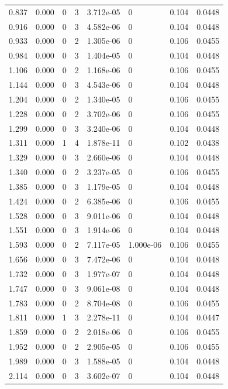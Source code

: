 \documentclass[preview]{standalone}
\begin{document}
{{\begin{tabular}{L{1.2cm}C{1.2cm} C{0.3cm}C{0.5cm} C{1.4cm}C{1.4cm} C{1.4cm}C{1.4cm}}
  0.837  &  0.000  & 0     &  3 &  3.712e-05  & 0  & 0.104 &  0.0448   \\ 
  0.916  &  0.000  & 0     &  3 &  4.582e-06  & 0  & 0.104 &  0.0448   \\ 
  0.933  &  0.000  & 0     &  2 &  1.305e-06  & 0  & 0.106 &  0.0455   \\ 
  0.984  &  0.000  & 0     &  3 &  1.404e-05  & 0  & 0.104 &  0.0448   \\ 
  1.106  &  0.000  & 0     &  2 &  1.168e-06  & 0  & 0.106 &  0.0455   \\ 
  1.144  &  0.000  & 0     &  3 &  4.543e-06  & 0  & 0.104 &  0.0448   \\ 
  1.204  &  0.000  & 0     &  2 &  1.340e-05  & 0  & 0.106 &  0.0455   \\ 
  1.228  &  0.000  & 0     &  2 &  3.702e-06  & 0  & 0.106 &  0.0455   \\ 
  1.299  &  0.000  & 0     &  3 &  3.240e-06  & 0  & 0.104 &  0.0448   \\ 
  1.311  &  0.000  & 1     &  4 &  1.878e-11  & 0  & 0.102 &  0.0438   \\ 
  1.329  &  0.000  & 0     &  3 &  2.660e-06  & 0  & 0.104 &  0.0448   \\ 
  1.340  &  0.000  & 0     &  2 &  3.237e-05  & 0  & 0.106 &  0.0455   \\ 
  1.385  &  0.000  & 0     &  3 &  1.179e-05  & 0  & 0.104 &  0.0448   \\ 
  1.424  &  0.000  & 0     &  2 &  6.385e-06  & 0  & 0.106 &  0.0455   \\ 
  1.528  &  0.000  & 0     &  3 &  9.011e-06  & 0  & 0.104 &  0.0448   \\ 
  1.551  &  0.000  & 0     &  3 &  1.914e-06  & 0  & 0.104 &  0.0448   \\ 
  1.593  &  0.000  & 0     &  2 &  7.117e-05  & 1.000e-06  & 0.106 &  0.0455   \\ 
  1.656  &  0.000  & 0     &  3 &  7.472e-06  & 0  & 0.104 &  0.0448   \\ 
  1.732  &  0.000  & 0     &  3 &  1.977e-07  & 0  & 0.104 &  0.0448   \\ 
  1.747  &  0.000  & 0     &  3 &  9.061e-08  & 0  & 0.104 &  0.0448   \\ 
  1.783  &  0.000  & 0     &  2 &  8.704e-08  & 0  & 0.106 &  0.0455   \\ 
  1.811  &  0.000  & 1     &  3 &  2.278e-11  & 0  & 0.104 &  0.0447   \\ 
  1.859  &  0.000  & 0     &  2 &  2.018e-06  & 0  & 0.106 &  0.0455   \\ 
  1.952  &  0.000  & 0     &  2 &  2.905e-05  & 0  & 0.106 &  0.0455   \\ 
  1.989  &  0.000  & 0     &  3 &  1.588e-05  & 0  & 0.104 &  0.0448   \\ 
  2.114  &  0.000  & 0     &  3 &  3.602e-07  & 0  & 0.104 &  0.0448   \\ 
\hline 
\end{tabular} 

}}
\end{document}
